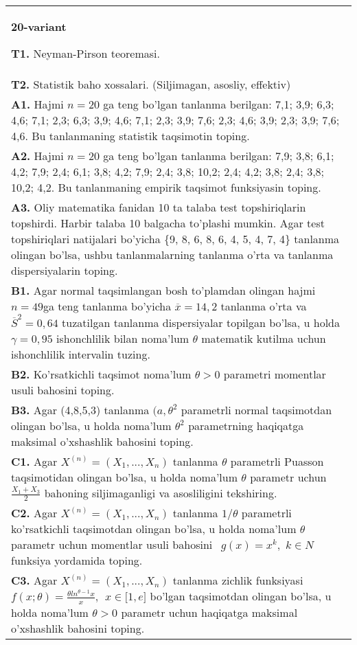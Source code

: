 \documentclass{article}
\begin{document}
\begin{tabular}{m{17cm}}
\textbf{20-variant}
\newline

\textbf{T1.} 
Neyman-Pirson teoremasi.
\\
\textbf{T2.} 
Statistik baho xossalari. (Siljimagan, asosliy, effektiv)
\\
\textbf{A1.} 
Hajmi \(n = 20\) ga teng bo'lgan tanlanma berilgan: 7,1; 3,9; 6,3; 4,6; 7,1; 2,3; 6,3; 3,9; 4,6; 7,1; 2,3; 3,9; 7,6; 2,3; 4,6; 3,9; 2,3; 3,9; 7,6; 4,6. Bu tanlanmaning statistik taqsimotin toping.
\\
\textbf{A2.} 
Hajmi \(n = 20\) ga teng bo'lgan tanlanma berilgan: 7,9; 3,8; 6,1; 4,2; 7,9; 2,4; 6,1; 3,8; 4,2; 7,9; 2,4; 3,8; 10,2; 2,4; 4,2; 3,8; 2,4; 3,8; 10,2; 4,2. Bu tanlanmaning empirik taqsimot funksiyasin toping.
\\
\textbf{A3.} 
Oliy matematika fanidan 10 ta talaba test topshiriqlarin topshirdi. Harbir talaba 10 balgacha to'plashi mumkin. Agar test topshiriqlari natijalari bo'yicha \{9, 8, 6, 8, 6, 4, 5, 4, 7, 4\} tanlanma olingan bo'lsa, ushbu tanlanmalarning tanlanma o'rta va tanlanma dispersiyalarin toping.
\\
\textbf{B1.} 
Agar normal taqsimlangan bosh to'plamdan olingan hajmi \(n = 49\)ga teng tanlanma bo'yicha \(\overline{x} = 14,2\) tanlanma o'rta va \({\overline{S}}^{2} = 0,64\) tuzatilgan tanlanma dispersiyalar topilgan bo'lsa, u holda \(\gamma = 0,95\) ishonchlilik bilan noma'lum \(\theta\) matematik kutilma uchun ishonchlilik intervalin tuzing.
\\
\textbf{B2.} 
Ko'rsatkichli taqsimot noma'lum \(\theta > 0\) parametri momentlar usuli bahosini toping.
\\
\textbf{B3.} 
Agar (4,8,5,3) tanlanma \((a,\theta^{2}\) parametrli normal taqsimotdan olingan bo'lsa, u holda noma'lum \(\theta^{2}\) parametrning haqiqatga maksimal o'xshashlik bahosini toping.
\\
\textbf{C1.} 
Agar \(X^{(n)} = \left( X_{1},...,X_{n} \right)\) tanlanma \(\theta\) parametrli Puasson taqsimotidan olingan bo'lsa, u holda noma'lum \(\theta\) parametr uchun \(\frac{X_{1} + X_{3}}{2}\) bahoning siljimaganligi va asosliligini tekshiring.
\\
\textbf{C2.} 
Agar \(X^{(n)} = \left( X_{1},...,X_{n} \right)\) tanlanma \(1/\theta\) parametrli ko'rsatkichli taqsimotdan olingan bo'lsa, u holda noma'lum \(\theta\) parametr uchun momentlar usuli bahosini \(\ \ g(x) = x^{k},\) \(k \in N\) funksiya yordamida toping.
\\
\textbf{C3.} 
Agar \(X^{(n)} = \left( X_{1},...,X_{n} \right)\) tanlanma zichlik funksiyasi \(f(x;\theta) = \frac{\theta ln^{\theta - 1}x}{x},\ \ x \in \lbrack 1,e\rbrack\) bo'lgan taqsimotdan olingan bo'lsa, u holda noma'lum \(\theta > 0\) parametr uchun haqiqatga maksimal o'xshashlik bahosini toping.
\\

\end{tabular}
\vspace{1cm}
\end{document}
